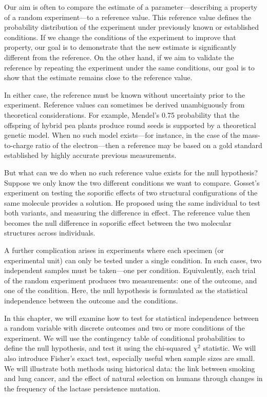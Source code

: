 \documentclass[
]{book}
\begin{document}
Our aim is often to compare the estimate of a parameter---describing a property of a random experiment---to a reference value. This reference value defines the probability distribution of the experiment under previously known or established conditions. If we change the conditions of the experiment to improve that property, our goal is to demonstrate that the new estimate is significantly different from the reference. On the other hand, if we aim to validate the reference by repeating the experiment under the same conditions, our goal is to show that the estimate remains close to the reference value.

In either case, the reference must be known without uncertainty prior to the experiment. Reference values can sometimes be derived unambiguously from theoretical considerations. For example, Mendel's 0.75 probability that the offspring of hybrid pea plants produce round seeds is supported by a theoretical genetic model. When no such model exists---for instance, in the case of the mass-to-charge ratio of the electron---then a reference may be based on a gold standard established by highly accurate previous measurements.

But what can we do when no such reference value exists for the null hypothesis? Suppose we only know the two different conditions we want to compare. Gosset's experiment on testing the soporific effects of two structural configurations of the same molecule provides a solution. He proposed using the same individual to test both variants, and measuring the difference in effect. The reference value then becomes the null difference in soporific effect between the two molecular structures across individuals.

A further complication arises in experiments where each specimen (or experimental unit) can only be tested under a single condition. In such cases, two independent samples must be taken---one per condition. Equivalently, each trial of the random experiment produces two measurements: one of the outcome, and one of the condition. Here, the null hypothesis is formulated as the statistical independence between the outcome and the conditions.

In this chapter, we will examine how to test for statistical independence between a random variable with discrete outcomes and two or more conditions of the experiment. We will use the contingency table of conditional probabilities to define the null hypothesis, and test it using the chi-squared \(\chi^2\) statistic. We will also introduce Fisher's exact test, especially useful when sample sizes are small. We will illustrate both methods using historical data: the link between smoking and lung cancer, and the effect of natural selection on humans through changes in the frequency of the lactase persistence mutation.
\end{document}
